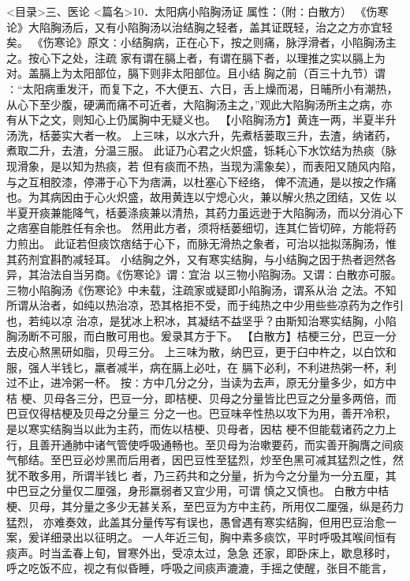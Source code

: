\documentclass[a4paper,12pt,UTF8,twoside]{ctexbook}
\begin{document}
<目录>三、医论
<篇名>10．太阳病小陷胸汤证
属性：（附∶白散方） 
《伤寒论》大陷胸汤后，又有小陷胸汤以治结胸之轻者，盖其证既轻，治之之方亦宜轻矣。 
《伤寒论》原文∶小结胸病，正在心下，按之则痛，脉浮滑者，小陷胸汤主之。按心下之处，注疏 
家有谓在膈上者，有谓在膈下者，以理推之实以膈上为对。盖膈上为太阳部位，膈下则非太阳部位。且小结 
胸之前（百三十九节）谓∶“太阳病重发汗，而复下之，不大便五、六日，舌上燥而渴，日晡所小有潮热， 
从心下至少腹，硬满而痛不可近者，大陷胸汤主之，”观此大陷胸汤所主之病，亦 
有从下之文，则知心上仍属胸中无疑义也。 
【小陷胸汤方】黄连一两，半夏半升汤洗，栝蒌实大者一枚。 
上三味，以水六升，先煮栝蒌取三升，去渣，纳诸药，煮取二升，去渣，分温三服。 
此证乃心君之火炽盛，铄耗心下水饮结为热痰（脉现滑象，是以知为热痰，若 
但有痰而不热，当现为濡象矣），而表阳又随风内陷，与之互相胶漆，停滞于心下为痞满，以杜塞心下经络， 
俾不流通，是以按之作痛也。为其病因由于心火炽盛，故用黄连以宁熄心火，兼以解火热之团结，又佐 
以半夏开痰兼能降气，栝蒌涤痰兼以清热，其药力虽远逊于大陷胸汤，而以分消心下之痞塞自能胜任有余也。 
然用此方者，须将栝蒌细切，连其仁皆切碎，方能将药力煎出。 
此证若但痰饮痞结于心下，而脉无滑热之象者，可治以拙拟荡胸汤，惟其药剂宜斟酌减轻耳。 
小结胸之外，又有寒实结胸，与小结胸之因于热者迥然各异，其治法自当另商。《伤寒论》谓∶宜治 
以三物小陷胸汤。又谓∶白散亦可服。三物小陷胸汤《伤寒论》中未载，注疏家或疑即小陷胸汤，谓系从治 
之法。不知所谓从治者，如纯以热治凉，恐其格拒不受，而于纯热之中少用些些凉药为之作引也，若纯以凉 
治凉，是犹冰上积冰，其凝结不益坚乎？由斯知治寒实结胸，小陷胸汤断不可服，而白散可用也。爰录其方于下。 
【白散方】桔梗三分，巴豆一分去皮心熬黑研如脂，贝母三分。 
上三味为散，纳巴豆，更于臼中杵之，以白饮和服，强人半钱匕，羸者减半，病在膈上必吐，在 
膈下必利，不利进热粥一杯，利过不止，进冷粥一杯。 
按∶方中几分之分，当读为去声，原无分量多少，如方中桔 
梗、贝母各三分，巴豆一分，即桔梗、贝母之分量皆比巴豆之分量多两倍，而巴豆仅得桔梗及贝母之分量三 
分之一也。巴豆味辛性热以攻下为用，善开冷积，是以寒实结胸当以此为主药，而佐以桔梗、贝母者，因枯 
梗不但能载诸药之力上行，且善开通肺中诸气管使呼吸通畅也。至贝母为治嗽要药，而实善开胸膺之间痰 
气郁结。至巴豆必炒黑而后用者，因巴豆性至猛烈，炒至色黑可减其猛烈之性，然犹不敢多用，所谓半钱匕 
者，乃三药共和之分量，折为今之分量为一分五厘，其中巴豆之分量仅二厘强，身形羸弱者又宜少用，可谓 
慎之又慎也。 
白散方中桔梗、贝母，其分量之多少无甚关系，至巴豆为方中主药，所用仅二厘强，纵是药力猛烈， 
亦难奏效，此盖其分量传写有误也，愚曾遇有寒实结胸，但用巴豆治愈一案，爰详细录出以征明之。 
一人年近三旬，胸中素多痰饮，平时呼吸其喉间恒有痰声。时当孟春上旬，冒寒外出，受凉太过，急急 
还家，即卧床上，歇息移时，呼之吃饭不应，视之有似昏睡，呼吸之间痰声漉漉，手摇之使醒，张目不能言， 
\end{document}
